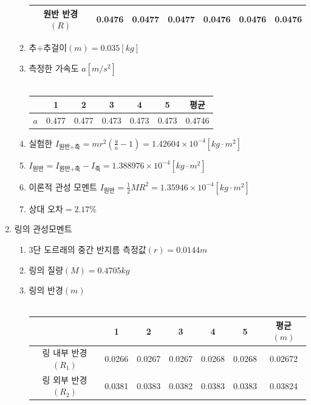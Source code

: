 \documentclass[12pt,a4paper]{article}
\begin{document}
\begin{enumerate}
\begin{enumerate}
\begin{tabular}{|c|c|c|c|c|c|c|}
                    \hline
                    원반 반경$(R)$&0.0476&0.0477&0.0477&0.0476&0.0476&0.0476 \\
                    \hline
                \end{tabular}
            \item 추+추걸이$(m)=0.035[kg]$
            \item 측정한 가속도 $a[m/s^2]$ \\
                \\
                \begin{tabular}{|c|c|c|c|c|c|c|}
                    \hline
                    &1&2&3&4&5&평균 \\
                    \hline
                    $a$&0.477&0.477&0.473&0.473&0.473&0.4746 \\
                    \hline
                \end{tabular}
            \item 실험한 $I_{\textrm{원반+축}}=
                mr^2(\frac{g}{a}-1)=1.42604\times10^{-4}[kg\cdot m^2]$
            \item $I_{\textrm{원반}}=I_{\textrm{원반+축}}-I_{\textrm{축}}=
                1.388976\times10^{-4}[kg\cdot m^2]$
            \item 이론적 관성 모멘트 $I_{\textrm{원반}}=\frac{1}{2}MR^2=
                1.35946\times10^{-4}[kg\cdot m^2]$
            \item 상대 오차$=2.17\%$
        \end{enumerate}
    \item 링의 관성모멘트
        \begin{enumerate}
            \item 3단 도르래의 중간 반지름 측정값$(r)=0.0144m$
            \item 링의 질량$(M)=0.4705kg$
            \item 링의 반경$(m)$ \\
                \\
                \begin{tabular}{|c|c|c|c|c|c|c|}
                    \hline
                    &1&2&3&4&5&평균$(m)$ \\
                    \hline
                    링 내부 반경$(R_1)$&0.0266&0.0267&0.0267&0.0268&0.0268&
                        0.02672 \\
                    \hline
                    링 외부 반경$(R_2)$&0.0381&0.0383&0.0382&0.0383&0.0383&
                        0.03824 \\

\end{tabular}
\end{enumerate}
\end{enumerate}
\end{document}

